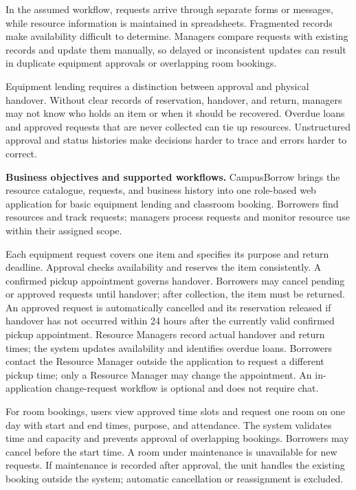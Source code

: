 \documentclass[11pt]{article}
\begin{document}
In the assumed workflow, requests arrive through separate forms or messages, while resource information is maintained in spreadsheets. Fragmented records make availability difficult to determine. Managers compare requests with existing records and update them manually, so delayed or inconsistent updates can result in duplicate equipment approvals or overlapping room bookings.

Equipment lending requires a distinction between approval and physical handover. Without clear records of reservation, handover, and return, managers may not know who holds an item or when it should be recovered. Overdue loans and approved requests that are never collected can tie up resources. Unstructured approval and status histories make decisions harder to trace and errors harder to correct.

\textbf{Business objectives and supported workflows.} CampusBorrow brings the resource catalogue, requests, and business history into one role-based web application for basic equipment lending and classroom booking. Borrowers find resources and track requests; managers process requests and monitor resource use within their assigned scope.

Each equipment request covers one item and specifies its purpose and return deadline. Approval checks availability and reserves the item consistently. A confirmed pickup appointment governs handover. Borrowers may cancel pending or approved requests until handover; after collection, the item must be returned. An approved request is automatically cancelled and its reservation released if handover has not occurred within 24 hours after the currently valid confirmed pickup appointment. Resource Managers record actual handover and return times; the system updates availability and identifies overdue loans. Borrowers contact the Resource Manager outside the application to request a different pickup time; only a Resource Manager may change the appointment. An in-application change-request workflow is optional and does not require chat.

For room bookings, users view approved time slots and request one room on one day with start and end times, purpose, and attendance. The system validates time and capacity and prevents approval of overlapping bookings. Borrowers may cancel before the start time. A room under maintenance is unavailable for new requests. If maintenance is recorded after approval, the unit handles the existing booking outside the system; automatic cancellation or reassignment is excluded.
\end{document}

